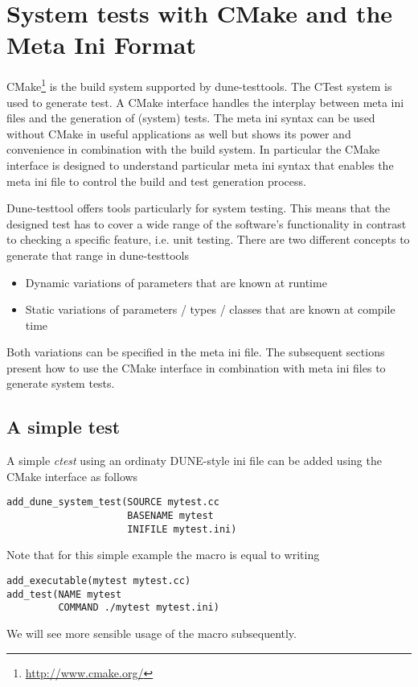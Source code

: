 \documentclass[11pt]{article}
\begin{document}
\section{System tests with CMake and the Meta Ini Format}
\label{sec:systemtest}
CMake\footnote{\url{http://www.cmake.org/}} is the build system supported by dune-testtools. The CTest system is used to generate test.
A CMake interface handles the interplay between
meta ini files and the generation of (system) tests. The meta ini syntax can be used without CMake in useful applications as well but
shows its power and convenience in combination with the build system. In particular the CMake interface is designed to understand particular
meta ini syntax that enables the meta ini file to control the build and test generation process.

Dune-testtool offers tools particularly for system testing. This means that the designed test has to cover a wide range of the
software's functionality in contrast to checking a specific feature, i.e. unit testing. There are two different concepts to
generate that range in dune-testtools
\begin{itemize}
 \item Dynamic variations of parameters that are known at runtime
 \item Static variations of parameters / types / classes that are known at compile time
\end{itemize}
Both variations can be specified in the meta ini file.
The subsequent sections present how to use the CMake interface in combination with meta ini files to generate system tests.

\subsection{A simple test}
A simple \emph{ctest} using an ordinaty DUNE-style ini file can be added using the CMake interface as follows
\begin{lstlisting}[caption={A CMakeLists.txt adding a simple test with the dune-testtools CMake interface function \lstinline!add_dune_system_test!}]
add_dune_system_test(SOURCE mytest.cc
                     BASENAME mytest
                     INIFILE mytest.ini)
\end{lstlisting}

Note that for this simple example the macro is equal to writing
\begin{lstlisting}[caption={A CMakeLists.txt adding a simple test with the standard CMake macros}]
add_executable(mytest mytest.cc)
add_test(NAME mytest
         COMMAND ./mytest mytest.ini)
\end{lstlisting}
We will see more sensible usage of the macro subsequently.
\end{document}
